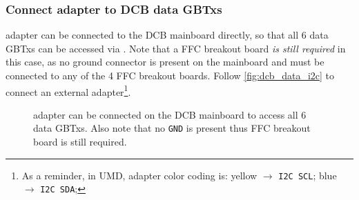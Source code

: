 \subsubsection{Connect \itwoc adapter to DCB data GBTxs}
\itwoc adapter can be connected to the DCB mainboard directly, so that all 6
data GBTxs can be accessed via \itwoc.
Note that a FFC breakout board \emph{is still required} in this case, as no
ground connector is present on the mainboard and must be connected to any of the
4 FFC breakout boards.
Follow \autoref{fig:dcb_data_i2c} to connect an external \itwoc
adapter\footnote{
    As a reminder, in UMD, \itwoc adapter color coding is:
    yellow $\rightarrow$ \texttt{I2C SCL};
    blue $\rightarrow$ \texttt{I2C SDA};
}.

\begin{figure}[!ht]
\centering
{}
\caption{
    \itwoc adapter can be connected on the DCB mainboard to access all 6 data
    GBTxs.
    Also note that no \texttt{GND} is present thus FFC breakout board is still
    required.
}
\label{fig:dcb_data_i2c}
\end{figure}
